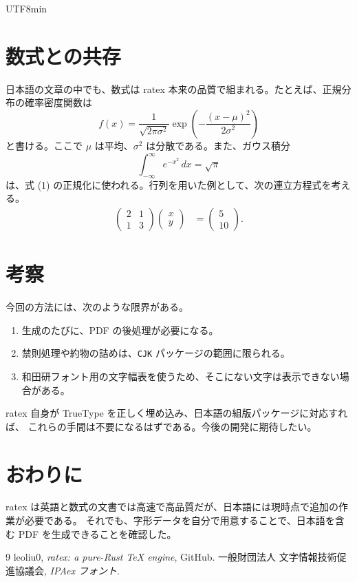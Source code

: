 \documentclass[11pt]{article}
\newcommand{\goth}[1]{{\CJKfamily{goth}#1}}
\begin{document}
\begin{CJK}{UTF8}{min}
\section{\goth{数式との共存}}
日本語の文章の中でも、数式は ratex 本来の品質で組まれる。たとえば、正規分布の確率密度関数は
\begin{equation}
  f(x) = \frac{1}{\sqrt{2\pi\sigma^2}} \exp\!\left( -\frac{(x-\mu)^2}{2\sigma^2} \right)
\end{equation}
と書ける。ここで $\mu$ は平均、$\sigma^2$ は分散である。また、ガウス積分
\begin{equation}
  \int_{-\infty}^{\infty} e^{-x^2}\,dx = \sqrt{\pi}
\end{equation}
は、式 (1) の正規化に使われる。行列を用いた例として、次の連立方程式を考える。
\begin{align}
  \begin{pmatrix} 2 & 1 \\ 1 & 3 \end{pmatrix}
  \begin{pmatrix} x \\ y \end{pmatrix}
  &=
  \begin{pmatrix} 5 \\ 10 \end{pmatrix}.
\end{align}

\section{\goth{考察}}
今回の方法には、次のような限界がある。
\begin{enumerate}
  \item 生成のたびに、PDF の後処理が必要になる。
  \item 禁則処理や約物の詰めは、\texttt{CJK} パッケージの範囲に限られる。
  \item 和田研フォント用の文字幅表を使うため、そこにない文字は表示できない場合がある。
\end{enumerate}
ratex 自身が TrueType を正しく埋め込み、日本語の組版パッケージに対応すれば、
これらの手間は不要になるはずである。今後の開発に期待したい。

\section{\goth{おわりに}}
ratex は英語と数式の文書では高速で高品質だが、日本語には現時点で追加の作業が必要である。
それでも、字形データを自分で用意することで、日本語を含む PDF を生成できることを確認した。

\begin{thebibliography}{9}
 leoliu0, \textit{ratex: a pure-Rust TeX engine}, GitHub.
 一般財団法人 文字情報技術促進協議会, \textit{IPAex フォント}.
\end{thebibliography}
\end{CJK}
\end{document}
